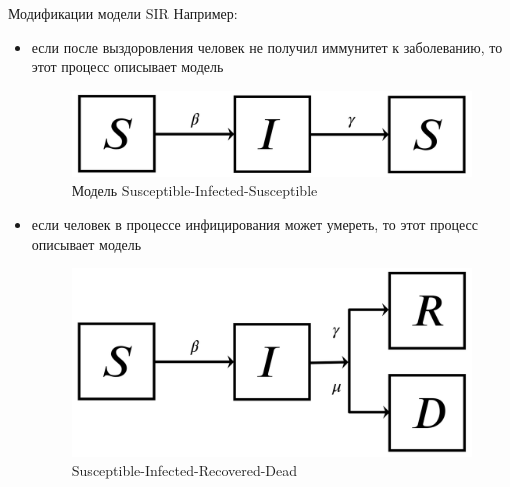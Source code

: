 \documentclass[notheorems]{beamer}
\begin{document}
\begin{frame}
	{Модификации модели SIR}
	 Например:
	\begin{itemize}
		\item если после выздоровления человек не получил иммунитет к заболеванию, то этот процесс описывает модель 
		\begin{figure}
			\centering
			\includegraphics[scale=0.15]{images/img02}
			\caption{Модель Susceptible-Infected-Susceptible}
			\label{fig:img02}
		\end{figure}
		
		\item если человек в процессе инфицирования может умереть, то этот процесс описывает модель 
		\begin{figure}
			\centering
			\includegraphics[scale=0.15]{images/img03}
			\caption{Susceptible-Infected-Recovered-Dead}
			\label{fig:img03}
		\end{figure}
		
	\end{itemize}
\end{frame}
\end{document}
